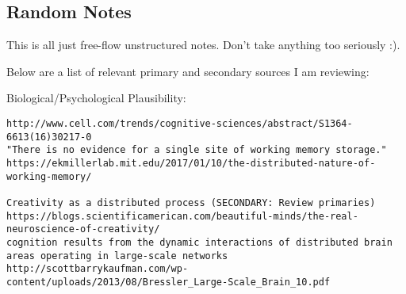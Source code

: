 \documentclass[a4paper]{article}
\begin{document}
\subsection{Random Notes}

This is all just free-flow unstructured notes. Don't take anything too seriously :).

Below are a list of relevant primary and secondary sources I am reviewing:

Biological/Psychological Plausibility:
\begin{verbatim}
http://www.cell.com/trends/cognitive-sciences/abstract/S1364-6613(16)30217-0
"There is no evidence for a single site of working memory storage."
https://ekmillerlab.mit.edu/2017/01/10/the-distributed-nature-of-working-memory/

Creativity as a distributed process (SECONDARY: Review primaries)
https://blogs.scientificamerican.com/beautiful-minds/the-real-neuroscience-of-creativity/
cognition results from the dynamic interactions of distributed brain areas operating in large-scale networks
http://scottbarrykaufman.com/wp-content/uploads/2013/08/Bressler_Large-Scale_Brain_10.pdf

\end{verbatim}




\end{document}
